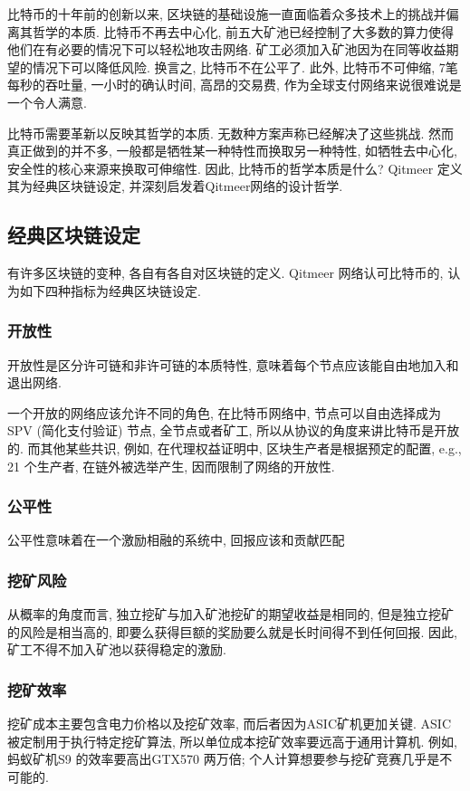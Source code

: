 \documentclass[a4paper,11pt]{article}
\begin{document}
比特币的十年前的创新以来, 区块链的基础设施一直面临着众多技术上的挑战并偏离其哲学的本质. 比特币不再去中心化, 前五大矿池已经控制了大多数的算力使得他们在有必要的情况下可以轻松地攻击网络. 矿工必须加入矿池因为在同等收益期望的情况下可以降低风险. 换言之, 比特币不在公平了. 此外, 比特币不可伸缩, 7笔每秒的吞吐量, 一小时的确认时间, 高昂的交易费, 作为全球支付网络来说很难说是一个令人满意.

比特币需要革新以反映其哲学的本质. 无数种方案声称已经解决了这些挑战. 然而真正做到的并不多, 一般都是牺牲某一种特性而换取另一种特性, 如牺牲去中心化, 安全性的核心来源来换取可伸缩性. 因此, 比特币的哲学本质是什么? Qitmeer 定义其为经典区块链设定, 并深刻启发着Qitmeer网络的设计哲学. 


\subsection{经典区块链设定}
有许多区块链的变种, 各自有各自对区块链的定义.  Qitmeer 网络认可比特币的, 认为如下四种指标为经典区块链设定.

\subsubsection{开放性}
开放性是区分许可链和非许可链的本质特性, 意味着每个节点应该能自由地加入和退出网络.

一个开放的网络应该允许不同的角色, 在比特币网络中, 节点可以自由选择成为SPV (简化支付验证) 节点, 全节点或者矿工, 所以从协议的角度来讲比特币是开放的. 而其他某些共识, 例如, 在代理权益证明中, 区块生产者是根据预定的配置, e.g., 21 个生产者, 在链外被选举产生, 因而限制了网络的开放性.

\subsubsection{公平性}
公平性意味着在一个激励相融的系统中, 回报应该和贡献匹配

\subsubsection*{挖矿风险}
从概率的角度而言, 独立挖矿与加入矿池挖矿的期望收益是相同的, 但是独立挖矿的风险是相当高的, 即要么获得巨额的奖励要么就是长时间得不到任何回报. 因此, 矿工不得不加入矿池以获得稳定的激励. 

\subsubsection*{挖矿效率}
挖矿成本主要包含电力价格以及挖矿效率, 而后者因为ASIC矿机更加关键. ASIC 被定制用于执行特定挖矿算法, 所以单位成本挖矿效率要远高于通用计算机. 例如, 蚂蚁矿机S9 的效率要高出GTX570 两万倍; 个人计算想要参与挖矿竞赛几乎是不可能的. 
\end{document}
